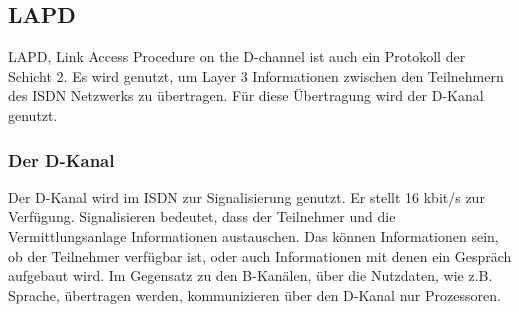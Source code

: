 \documentclass[12pt, a4paper, ngerman]{article}
\begin{document}
\subsection{LAPD}
LAPD, Link Access Procedure on the D-channel ist auch ein Protokoll der Schicht 2. Es wird genutzt, um Layer 3 Informationen zwischen den Teilnehmern des ISDN Netzwerks zu übertragen. Für diese Übertragung wird der D-Kanal genutzt.


\subsubsection{Der D-Kanal}
Der D-Kanal wird im ISDN zur Signalisierung genutzt. Er stellt 16 kbit/s zur Verfügung. Signalisieren bedeutet, dass der Teilnehmer und die Vermittlungsanlage Informationen austauschen. Das können Informationen sein, ob der Teilnehmer verfügbar ist, oder auch Informationen mit denen ein Gespräch aufgebaut wird. Im Gegensatz zu den B-Kanälen, über die Nutzdaten, wie z.B. Sprache, übertragen werden, kommunizieren über den D-Kanal nur Prozessoren.
\end{document}
